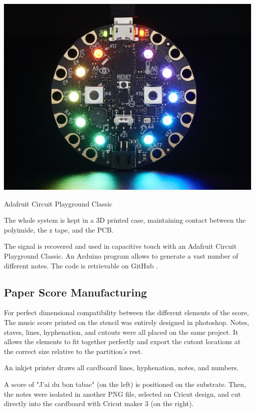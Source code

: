 \begin{marginfigure}
    \centering
    \includegraphics{images/circuit_playground_classic.jpg}
    \caption{Adafruit Circuit Playground Classic}
    \label{fig:circuit_playground_classic}
\end{marginfigure}

The whole system is kept in a 3D printed case, maintaining contact between the polyimide, the z tape, and the PCB.

The signal is recovered and used in capacitive touch with an Adafruit Circuit Playground Classic. An Arduino program allows to generate a vast number of different notes. The code is retrievable on GitHub \cite{adrien2022capacitive_to_notes}.


\subsection{Paper Score Manufacturing}

For perfect dimensional compatibility between the different elements of the score, The music score printed on the stencil was entirely designed in photoshop. Notes, staves, lines, hyphenation, and cutouts were all placed on the same project. It allows the elements to fit together perfectly and export the cutout locations at the correct size relative to the partition's rest.

An inkjet printer draws all cardboard lines, hyphenation, notes, and numbers.

A score of "J'ai du bon tabac" (on the left) is positioned on the substrate. Then, the notes were isolated in another PNG file, selected on Cricut design, and cut directly into the cardboard with Cricut maker 3 (on the right).

